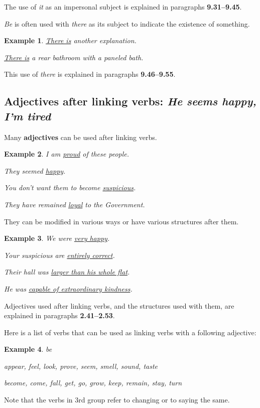 \documentclass[oneside]{book}
\numberwithin{equation}{section}
\newtheorem{example}{Example}[section]
\begin{document}
%
The use of \textit{it} as an impersonal subject is explained in paragraphs \textbf{9.31--9.45}.

%
\noindent{} \textit{Be} is often used with \textit{there} as its subject to indicate the existence of something.
\begin{example}
    \underline{There is} another explanation.
    
    \underline{There is} a rear bathroom with a paneled bath.
\end{example}
This use of \textit{there} is explained in paragraphs \textbf{9.46--9.55}.

\subsection{Adjectives after linking verbs: \textit{He seems happy, I'm tired}}
\noindent{} Many \textbf{adjectives} can be used after linking verbs.
\begin{example}
    I am \underline{proud} of these people.
    
    They seemed \underline{happy}.
    
    You don't want them to become \underline{suspicious}.
    
    They have remained \underline{loyal} to the Government.
\end{example}
They can be modified in various ways or have various structures after them.
\begin{example}
    We were \underline{very happy}.
    
    Your suspicious are \underline{entirely correct}.
    
    Their hall was \underline{larger than his whole flat}.
    
    He was \underline{capable of extraordinary kindness}.
\end{example}
Adjectives used after linking verbs, and the structures used with them, are explained in paragraphs \textbf{2.41--2.53}.

%
\noindent{} Here is a list of verbs that can be used as linking verbs with a following adjective:
\begin{example}
    be
    
    appear, feel, look, prove, seem, smell, sound, taste
    
    become, come, fall, get, go, grow, keep, remain, stay, turn
\end{example}
Note that the verbs in 3rd group refer to changing or to saying the same.
\end{document}

